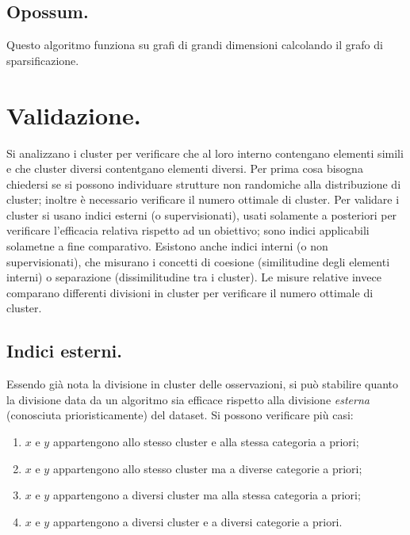\documentclass[11pt, a4page, twocolumn]{article}
\begin{document}
\subsection{Opossum.}
Questo algoritmo funziona su grafi di grandi dimensioni calcolando il grafo di sparsificazione.


\section{Validazione.}
Si analizzano i cluster per verificare che al loro interno contengano elementi simili e che cluster diversi contentgano elementi diversi.
Per prima cosa bisogna chiedersi se si possono individuare strutture non randomiche alla distribuzione di cluster; inoltre è necessario verificare il numero ottimale di cluster.
Per validare i cluster si usano indici esterni (o supervisionati), usati solamente a posteriori per verificare l'efficacia relativa rispetto ad un obiettivo; sono indici applicabili solametne a fine comparativo.
Esistono anche indici interni (o non supervisionati), che misurano i concetti di coesione (similitudine degli elementi interni) o separazione (dissimilitudine tra i cluster).
Le misure relative invece comparano differenti divisioni in cluster per verificare il numero ottimale di cluster.

\subsection{Indici esterni.}
Essendo già nota la divisione in cluster delle osservazioni, si può stabilire quanto la divisione data da un algoritmo sia efficace rispetto alla divisione \textit{esterna} (conosciuta prioristicamente) del dataset.
Si possono verificare più casi:
\begin{enumerate}[label=(\alph*)]
\item $x$ e $y$ appartengono allo stesso cluster e alla stessa categoria a priori;
\item $x$ e $y$ appartengono allo stesso cluster ma a diverse categorie a priori;
\item $x$ e $y$ appartengono a diversi cluster ma alla stessa categoria a priori;
\item $x$ e $y$ appartengono a diversi cluster e a diversi categorie a priori.
\end{enumerate}
\end{document}
